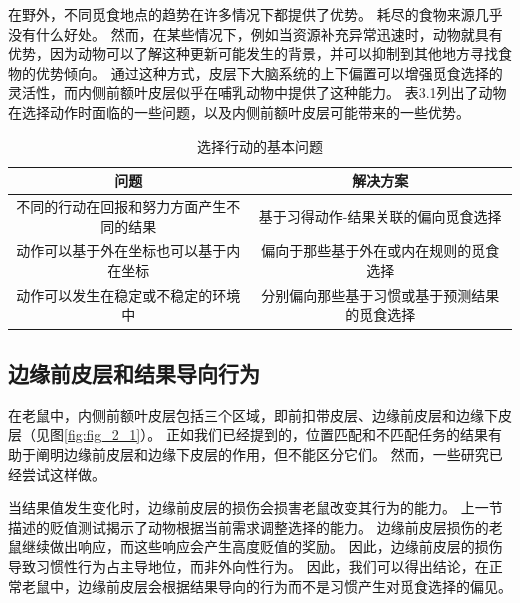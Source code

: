 在野外，不同觅食地点的趋势在许多情况下都提供了优势。
耗尽的食物来源几乎没有什么好处。
然而，在某些情况下，例如当资源补充异常迅速时，动物就具有优势，因为动物可以了解这种更新可能发生的背景，并可以抑制到其他地方寻找食物的优势倾向。
通过这种方式，皮层下大脑系统的上下偏置可以增强觅食选择的灵活性，而内侧前额叶皮层似乎在哺乳动物中提供了这种能力。
表3.1列出了动物在选择动作时面临的一些问题，以及内侧前额叶皮层可能带来的一些优势。\par


\begin{table}[htbp]
	\newcommand{\tabincell}[2]{\begin{tabular}{@{}#1@{}}#2\end{tabular}} %
	\centering
	\caption{选择行动的基本问题}
	\renewcommand\arraystretch{1.5}	%
	\begin{tabular}{c c }	 %
		\hline	%
		问题 & 解决方案 \\	
		\hline  %
		不同的行动在回报和努力方面产生不同的结果 & 基于习得动作-结果关联的偏向觅食选择 \\
		\hline
		动作可以基于外在坐标也可以基于内在坐标 & 偏向于那些基于外在或内在规则的觅食选择 \\
		\hline
		动作可以发生在稳定或不稳定的环境中 & 分别偏向那些基于习惯或基于预测结果的觅食选择 \\
		\hline
	\end{tabular}%
\end{table}%



\subsection{边缘前皮层和结果导向行为}

在老鼠中，内侧前额叶皮层包括三个区域，即前扣带皮层、边缘前皮层和边缘下皮层（见图\ref{fig:fig_2_1}）。
正如我们已经提到的，位置匹配和不匹配任务的结果有助于阐明边缘前皮层和边缘下皮层的作用，但不能区分它们。
然而，一些研究已经尝试这样做。\par


当结果值发生变化时，边缘前皮层的损伤会损害老鼠改变其行为的能力。
上一节描述的贬值测试揭示了动物根据当前需求调整选择的能力。
边缘前皮层损伤的老鼠继续做出响应，而这些响应会产生高度贬值的奖励。
因此，边缘前皮层的损伤导致习惯性行为占主导地位，而非外向性行为\cite{balleine1998goal,corbit2003role}。
因此，我们可以得出结论，在正常老鼠中，边缘前皮层会根据结果导向的行为而不是习惯产生对觅食选择的偏见。\par


